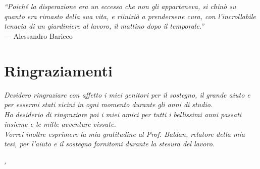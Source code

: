 
\cleardoublepage
{}
{}

\begin{flushright}{
	\slshape    
	``Poiché la disperazione era un eccesso che non gli apparteneva, si chinò su quanto era rimasto della sua vita, e riiniziò a prendersene cura, con l’incrollabile tenacia di un giardiniere al lavoro, il mattino dopo il temporale.''} \\ 
	\medskip
    --- Alessandro Baricco
\end{flushright}

\bigskip

\begingroup
\let\clearpage\relax
\let\cleardoublepage\relax
\let\cleardoublepage\relax

\chapter*{Ringraziamenti}

\noindent \textit{Desidero ringraziare con affetto i miei genitori per il sostegno, il grande aiuto e per essermi stati vicini in ogni momento durante gli anni di studio.}\\

\noindent \textit{Ho desiderio di ringraziare poi i miei amici per tutti i bellissimi anni passati insieme e le mille avventure vissute.}\\


\noindent \textit{Vorrei inoltre esprimere la mia gratitudine al Prof. Baldan, relatore della mia tesi, per l'aiuto e il sostegno fornitomi durante la stesura del lavoro.}\\


\bigskip

\noindent\textit{\myLocation, \myTime}
\hfill \myName

\endgroup

